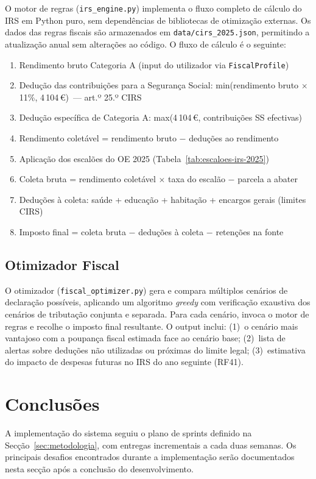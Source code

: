 O motor de regras (\texttt{irs\_engine.py}) implementa o fluxo completo de cálculo do \ac{IRS} em Python puro, sem dependências de bibliotecas de otimização externas. Os dados das regras fiscais são armazenados em \texttt{data/cirs\_2025.json}, permitindo a atualização anual sem alterações ao código. O fluxo de cálculo é o seguinte:

\begin{enumerate}
    \item Rendimento bruto Categoria A (input do utilizador via \texttt{FiscalProfile})
    \item Dedução das contribuições para a Segurança Social: min(rendimento bruto $\times$ 11\%, 4\,104\,€)~--- art.º 25.º \ac{CIRS}
    \item Dedução específica de Categoria A: max(4\,104\,€, contribuições SS efectivas)
    \item Rendimento coletável = rendimento bruto $-$ deduções ao rendimento
    \item Aplicação dos escalões do OE 2025 (Tabela~\ref{tab:escaloes-irs-2025})
    \item Coleta bruta = rendimento coletável $\times$ taxa do escalão $-$ parcela a abater
    \item Deduções à coleta: saúde + educação + habitação + encargos gerais (limites \ac{CIRS})
    \item Imposto final = coleta bruta $-$ deduções à coleta $-$ retenções na fonte
\end{enumerate}

\subsection{Otimizador Fiscal}
\label{sec:impl-fiscal-optimizer}

O otimizador (\texttt{fiscal\_optimizer.py}) gera e compara múltiplos cenários de declaração possíveis, aplicando um algoritmo \textit{greedy} com verificação exaustiva dos cenários de tributação conjunta e separada. Para cada cenário, invoca o motor de regras e recolhe o imposto final resultante. O output inclui: (1)~o cenário mais vantajoso com a poupança fiscal estimada face ao cenário base; (2)~lista de alertas sobre deduções não utilizadas ou próximas do limite legal; (3)~estimativa do impacto de despesas futuras no \ac{IRS} do ano seguinte (RF41).



\section{Conclusões}
\label{sec:impl-conclusoes}

A implementação do sistema seguiu o plano de sprints definido na Secção~\ref{sec:metodologia}, com entregas incrementais a cada duas semanas. Os principais desafios encontrados durante a implementação serão documentados nesta secção após a conclusão do desenvolvimento.
